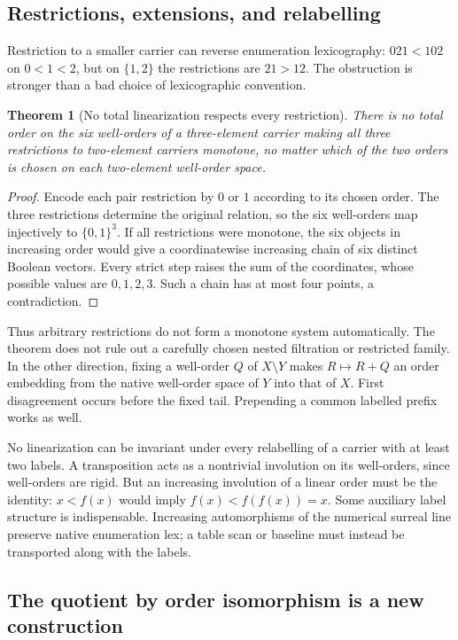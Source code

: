 \documentclass[11pt]{article}
\newtheorem{theorem}{Theorem}[section]
\theoremstyle{definition}
\theoremstyle{remark}
\begin{document}
\subsection{Restrictions, extensions, and relabelling}

Restriction to a smaller carrier can reverse enumeration lexicography:
$021<102$ on $0<1<2$, but on $\{1,2\}$ the restrictions are $21>12$.
The obstruction is stronger than a bad choice of lexicographic convention.

\begin{theorem}[No total linearization respects every restriction]\label{swo:cb:thm:restriction}
There is no total order on the six well-orders of a three-element carrier
making all three restrictions to two-element carriers monotone, no matter
which of the two orders is chosen on each two-element well-order space.
\end{theorem}
\begin{proof}
Encode each pair restriction by $0$ or $1$ according to its chosen order.
The three restrictions determine the original relation, so the six
well-orders map injectively to $\{0,1\}^3$. If all restrictions were
monotone, the six objects in increasing order would give a coordinatewise
increasing chain of six distinct Boolean vectors. Every strict step raises
the sum of the coordinates, whose possible values are $0,1,2,3$.
Such a chain has at most four points, a contradiction.
\end{proof}

Thus arbitrary restrictions do not form a monotone system automatically.
The theorem does not rule out a carefully chosen nested filtration or
restricted family. In the other direction, fixing a well-order $Q$ of
$X\setminus Y$ makes $R\mapsto R+Q$ an order embedding from the native
well-order space of $Y$ into that of $X$. First disagreement occurs before
the fixed tail. Prepending a common labelled prefix works as well.

No linearization can be invariant under every relabelling of a carrier
with at least two labels. A transposition acts as a nontrivial involution
on its well-orders, since well-orders are rigid. But an increasing
involution of a linear order must be the identity: $x<f(x)$ would imply
$f(x)<f(f(x))=x$. Some auxiliary label structure is indispensable.
Increasing automorphisms of the numerical surreal line preserve native
enumeration lex; a table scan or baseline must instead be transported
along with the labels.

\subsection{The quotient by order isomorphism is a new construction}
\end{document}
